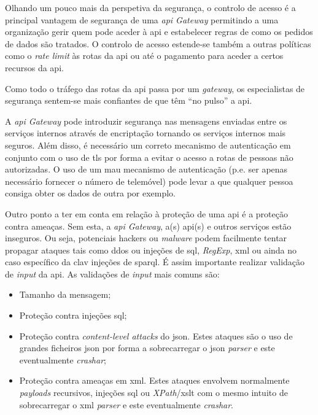 Olhando um pouco mais da perspetiva da segurança, o controlo de acesso é a principal vantagem de segurança de uma \textit{\acrshort{api} Gateway} permitindo a uma organização gerir quem pode aceder à \acrshort{api} e estabelecer regras de como os pedidos de dados são tratados. O controlo de acesso estende-se também a outras políticas como o \textit{rate limit} às rotas da \acrshort{api} ou até o pagamento para aceder a certos recursos da \acrshort{api}.

Como todo o tráfego das rotas da \acrshort{api} passa por um \textit{gateway}, os especialistas de segurança sentem-se mais confiantes de que têm ``no pulso'' a \acrshort{api}.~\cite{apiGatInfo}

A \textit{\acrshort{api} Gateway} pode introduzir segurança nas mensagens enviadas entre os serviços internos através de encriptação tornando os serviços internos mais seguros. Além disso, é necessário um correto mecanismo de autenticação em conjunto com o uso de \acrshort{tls} por forma a evitar o acesso a rotas de pessoas não autorizadas. O uso de um mau mecanismo de autenticação (p.e. ser apenas necessário fornecer o número de telemóvel) pode levar a que qualquer pessoa consiga obter os dados de outra por exemplo.

Outro ponto a ter em conta em relação à proteção de uma \acrshort{api} é a proteção contra ameaças. Sem esta, a \textit{\acrshort{api} Gateway}, a(s) \acrshort{api}(s) e outros serviços estão inseguros. Ou seja, potenciais hackers ou \textit{malware} podem facilmente tentar propagar ataques tais como \acrshort{ddos} ou injeções de \acrshort{sql}, \textit{RegExp}, \acrshort{xml} ou ainda no caso específico da \acrshort{clav} injeções de \acrshort{sparql}. É assim importante realizar validação de \textit{input} da \acrshort{api}. 
As validações de \textit{input} mais comuns são:
\begin{itemize}
    \item Tamanho da mensagem;
    \item Proteção contra injeções \acrshort{sql};
    \item Proteção contra \textit{content-level attacks} do \acrshort{json}. Estes ataques são o uso de grandes ficheiros \acrshort{json} por forma a sobrecarregar o \acrshort{json} \textit{parser} e este eventualmente \textit{crashar};
    \item Proteção contra ameaças em \acrshort{xml}. Estes ataques envolvem normalmente \textit{payloads} recursivos, injeções \acrshort{sql} ou \textit{XPath}/\acrshort{xslt} com o mesmo intuito de sobrecarregar o \acrshort{xml} \textit{parser} e este eventualmente \textit{crashar}.
\end{itemize}

